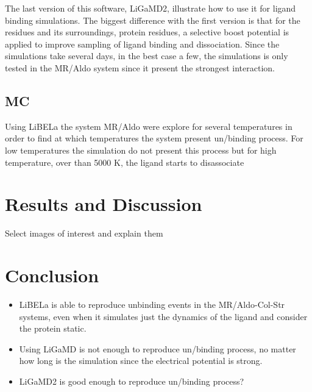 \documentclass[letter,10pt, twocolumn]{article}
\begin{document}
The last version of this software, LiGaMD2, illustrate how to use it for ligand binding simulations. The biggest difference with the first version is that for the residues and its surroundings, protein residues, a selective boost potential is applied to improve sampling of ligand binding and dissociation. Since the simulations take several days, in the best case a few, the simulations is only tested in the MR/Aldo system since it present the strongest interaction.


\subsection*{MC}

Using LiBELa the system MR/Aldo were explore for several temperatures in order to find at which temperatures the system present un/binding process. For low temperatures the simulation do not present this process but for high temperature, over than 5000 K, the ligand starts to disassociate


\section{Results and Discussion}

Select images of interest and explain them


\section{Conclusion}


\begin{itemize}

\item LiBELa  is able to reproduce unbinding events in the MR/Aldo-Col-Str systems, even when it simulates just the dynamics of the ligand and consider the protein static.

\item Using LiGaMD is not enough to reproduce un/binding process, no matter how long is the simulation since the electrical potential is strong. 

\item LiGaMD2 is good enough to reproduce un/binding process?

\end{itemize}



\clearpage
\onecolumn{


}
\end{document}
